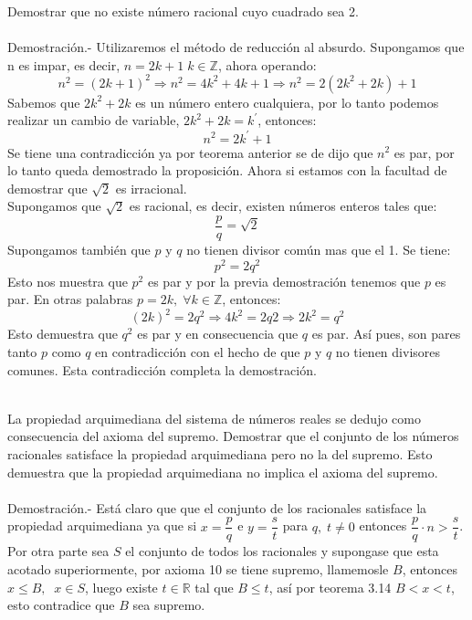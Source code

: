 \begin{teo}
Demostrar que no existe número racional cuyo cuadrado sea 2.\\\\
Demostración.- \; Utilizaremos el método de reducción al absurdo. Supongamos que n es impar, es decir, $n=2k+1\; k \in \mathbb{Z}$, ahora operando:
$$n^2=(2k+1)^2 \Rightarrow  n^2 = 4k^2 +4k + 1 \Rightarrow n^2=2(2k^2+2k)+1$$
Sabemos que $2k^2+2k$ es un número entero cualquiera, por lo tanto podemos realizar un cambio de variable, $2k^2+2k = k^{'}$, entonces:
$$n^2=2k^{'} +1$$
Se tiene una contradicción ya por teorema anterior se de dijo que $n^2$ es par, por lo tanto queda demostrado la proposición.  
Ahora si estamos con la facultad de demostrar que  $\sqrt{2}$ es irracional.\\
Supongamos que $\sqrt{2}$ es racional, es decir, existen números enteros tales que:
$$\displaystyle\frac{p}{q}=\sqrt{2}$$
Supongamos también que $p$ y $q$ no tienen divisor común mas que el 1. Se tiene:
$$p^2=2q^2$$
Esto nos muestra que $p^2$ es par y  por la previa demostración tenemos que $p$ es par. En otras palabras $p = 2k, \; \forall k \in \mathbb{Z}$, entonces:
$$(2k)^2 = 2q^2 \Rightarrow 4k^2 = 2q2 \Rightarrow 2k^2 = q^2 $$
Esto demuestra que $q^2$ es par y en consecuencia que $q$ es par. Así pues, son pares tanto $p$ como $q$ en contradicción con el hecho de que $p$ y $q$ no tienen divisores comunes. Esta contradicción completa la demostración.\\\\
\end{teo}

\begin{teo}
La propiedad arquimediana del sistema de números reales se dedujo como consecuencia del axioma del supremo. Demostrar que el conjunto de los números racionales satisface la propiedad arquimediana pero no la del supremo. Esto demuestra que la propiedad arquimediana no implica el axioma del supremo.\\\\
Demostración.- \; Está claro que que el conjunto de los racionales satisface la propiedad arquimediana ya que si $x=\dfrac{p}{q}$ e $y=\dfrac{s}{t}$ para $q,\; t \neq 0$ entonces $\dfrac{p}{q}\cdot n>\dfrac{s}{t}$.\\
Por otra parte sea $S$ el conjunto de todos los racionales y supongase que esta acotado superiormente, por axioma 10 se tiene supremo, llamemosle $B$, entonces $x\leq B, \; \; x \in S$, luego existe $t\in \mathbb{R}$ tal que $B\leq t$, así por teorema 3.14 \; $B<x<t$,  esto contradice que $B$ sea supremo.\\\\ 
\end{teo}


